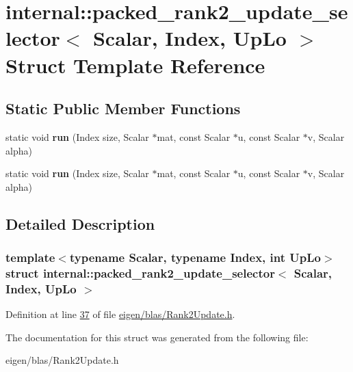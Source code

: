 \hypertarget{structinternal_1_1packed__rank2__update__selector}{}\section{internal\+:\+:packed\+\_\+rank2\+\_\+update\+\_\+selector$<$ Scalar, Index, Up\+Lo $>$ Struct Template Reference}
\label{structinternal_1_1packed__rank2__update__selector}
\subsection*{Static Public Member Functions}
\begin{DoxyCompactItemize}
\item 
\mbox{\label{structinternal_1_1packed__rank2__update__selector_ac715b62e82d418cc9d05b6e937019841}} 
static void {\bfseries run} (Index size, Scalar $\ast$mat, const Scalar $\ast$u, const Scalar $\ast$v, Scalar alpha)
\item 
\mbox{\label{structinternal_1_1packed__rank2__update__selector_ac715b62e82d418cc9d05b6e937019841}} 
static void {\bfseries run} (Index size, Scalar $\ast$mat, const Scalar $\ast$u, const Scalar $\ast$v, Scalar alpha)
\end{DoxyCompactItemize}


\subsection{Detailed Description}
\subsubsection*{template$<$typename Scalar, typename Index, int Up\+Lo$>$\newline
struct internal\+::packed\+\_\+rank2\+\_\+update\+\_\+selector$<$ Scalar, Index, Up\+Lo $>$}



Definition at line \hyperlink{eigen_2blas_2_rank2_update_8h_source_l00037}{37} of file \hyperlink{eigen_2blas_2_rank2_update_8h_source}{eigen/blas/\+Rank2\+Update.\+h}.



The documentation for this struct was generated from the following file\+:\begin{DoxyCompactItemize}
\item 
eigen/blas/\+Rank2\+Update.\+h\end{DoxyCompactItemize}
